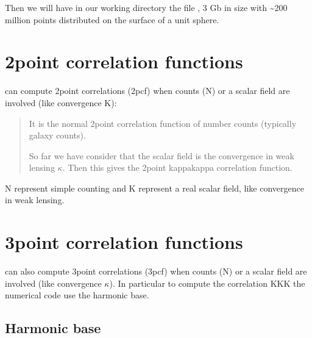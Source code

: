 \documentclass[letterpaper,10pt,english]{sphinxmanual}
\begin{document}
\sphinxAtStartPar
Then we will have in our working directory the file , 3 Gb in size with \textasciitilde{}200 million points distributed on the surface of a unit sphere.

\sphinxstepscope


\chapter{2\sphinxhyphen{}point correlation functions}
\label{\detokenize{2pcf:point-correlation-functions}}\label{\detokenize{2pcf::doc}}
\sphinxAtStartPar
{} can compute 2\sphinxhyphen{}point correlations (2pcf) when counts (N) or a scalar field are involved (like convergence K):
\begin{quote}\begin{description}
\sphinxAtStartPar
It is the normal 2\sphinxhyphen{}point correlation function of number counts (typically
galaxy counts).

\sphinxAtStartPar
So far we have consider that the scalar field is the convergence in weak lensing \(\kappa\). Then this gives the 2\sphinxhyphen{}point kappa\sphinxhyphen{}kappa correlation function.

\end{description}\end{quote}

\sphinxAtStartPar
N represent simple counting and K represent a real scalar field, like convergence in weak lensing.

\sphinxstepscope


\chapter{3\sphinxhyphen{}point correlation functions}
\label{\detokenize{3pcf:point-correlation-functions}}\label{\detokenize{3pcf::doc}}
\sphinxAtStartPar
{} can also compute 3\sphinxhyphen{}point correlations (3pcf) when counts (N) or a scalar field are involved (like convergence \(\kappa\)). In particular to compute the correlation KKK the numerical code use the harmonic base.


\section{Harmonic base}
\label{\detokenize{3pcf:harmonic-base}}
\end{document}
